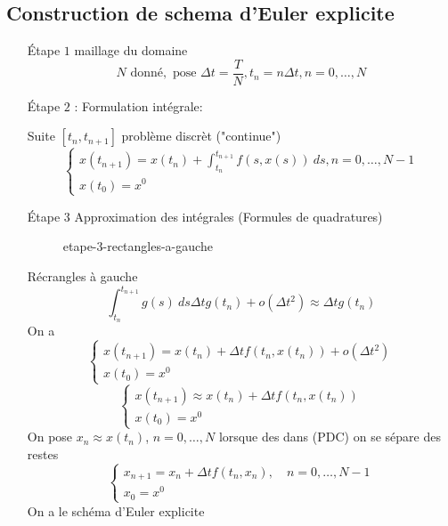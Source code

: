 \subsection{Construction de schema d'Euler explicite}
\begin{itemize}
    \item[Étape $1$] maillage du domaine
        \[
        N \text{ donné}, \text{ pose } \Delta t = \frac{T}{N},  t_n = n \Delta t, n = 0, \ldots, N
        \] 
    \item[Étape $2$]: Formulation intégrale:

        Suite $[t_n, t_{n+1}]$ problème discrèt ("continue")
        \begin{equation}
            \begin{cases}
                x(t_{n+1}) = x(t_n) + \int_{{t_n}}^{{t_{n+1}}} {f(s, x(s))} \: d{s} {, n=0, \ldots, N-1}\\
                x(t_0) = x^0
            \end{cases}
        \end{equation}
    \item[Étape $3$] Approximation des intégrales (Formules de quadratures)
\begin{figure}[H]
    \centering
    \caption{etape-3-rectangles-a-gauche}
    \label{fig:etape-3-rectangles-a-gauche}
\end{figure}
Récrangles à gauche
\[
    \int_{{t_n}}^{{t_{n+1}}} {g(s)} \: d{s} {\Delta t g(t_n) + o(\Delta t^2) \approx \Delta t g(t_n)}
\] 
On a 
\begin{equation}
    \begin{cases}
        x(t_{n+1}) = x(t_n) + \Delta t f(t_n, x(t_n)) + o(\Delta t^2)\\
        x(t_0) = x^0
    \end{cases}
\end{equation}
\begin{equation}
    \begin{cases}
        x(t_{n+1}) \approx x(t_n) + \Delta t f(t_n, x(t_n))\\
        x(t_0) = x^0
    \end{cases}
\end{equation}
On pose $x_n \approx x(t_n)$,  $n= 0, \ldots, N$ lorsque des dans (PDC) on se sépare des restes
\begin{equation}
    \begin{cases}
        x_{n+1} = x_n + \Delta t f(t_n, x_n),  \quad n = 0, \ldots, N-1\\
        x_0 = x^0
    \end{cases}
\end{equation}
On a le schéma d'Euler explicite
\end{itemize}
